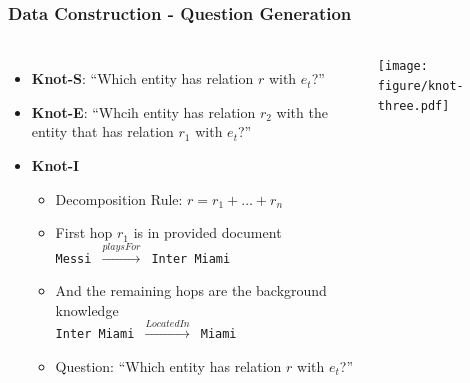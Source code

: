 \documentclass{beamer}
\begin{document}
\begin{frame}
    \frametitle{Data Construction - Question Generation}
    \begin{columns}[t]
        \begin{itemize}
            \item \textbf{Knot-S}: ``Which entity has relation \texttt{$r$} with \texttt{$e_t$}?''
            \item \textbf{Knot-E}: ``Whcih entity has relation $r_2$ with the entity that has relation $r_1$ with $e_t$?''
            \item \textbf{Knot-I}
            \begin{itemize}
                \item Decomposition Rule: $r = r_1 + \dots + r_n$
                \item First hop $r_1$ is in provided document \\ \texttt{Messi $\xrightarrow{playsFor}$ Inter Miami}
                \item And the remaining hops are the background knowledge \\ \texttt{Inter Miami $\xrightarrow{LocatedIn}$ Miami}
                \item Question: ``Which entity has relation \texttt{$r$} with \texttt{$e_t$}?''
            \end{itemize}
        \end{itemize}
        \begin{center}
            \vspace*{-1cm}
            \texttt{[image: figure/knot-three.pdf]}
        \end{center}
    \end{columns}
\end{frame}


\backmatter
{}


\end{document}
